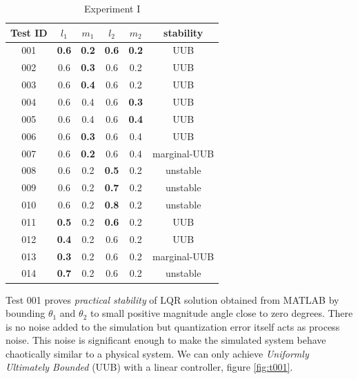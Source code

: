 \documentclass[journal]{IEEEtran}
\begin{document}
\begin{table}[!t]
\renewcommand{\arraystretch}{1.3}
\caption{Experiment I}
\label{tab:001}
\centering
\begin{tabular}{|c||c|c|c|c|c|}
\hline
Test ID & \(l_1\) & \(m_1\) & \(l_2\) & \(m_2\) & stability \\
\hline\hline
001 & \textbf{0.6} & \textbf{0.2} & \textbf{0.6} & \textbf{0.2} & UUB\\
002 & 0.6 & \textbf{0.3} & 0.6 & 0.2 & UUB\\
003 & 0.6 & \textbf{0.4} & 0.6 & 0.2 & UUB\\
004 & 0.6 & 0.4 & 0.6 & \textbf{0.3} & UUB\\
005 & 0.6 & 0.4 & 0.6 & \textbf{0.4} & UUB\\
006 & 0.6 & \textbf{0.3} & 0.6 & 0.4 & UUB\\
007 & 0.6 & \textbf{0.2} & 0.6 & 0.4 & marginal-UUB\\
008 & 0.6 & 0.2 & \textbf{0.5} & 0.2 & unstable\\
009 & 0.6 & 0.2 & \textbf{0.7} & 0.2 & unstable\\
010 & 0.6 & 0.2 & \textbf{0.8} & 0.2 & unstable\\
011 & \textbf{0.5} & 0.2 & \textbf{0.6} & 0.2 & UUB\\
012 & \textbf{0.4} & 0.2 & 0.6 & 0.2 & UUB \\
013 & \textbf{0.3} & 0.2 & 0.6 & 0.2 & marginal-UUB\\
014 & \textbf{0.7} & 0.2 & 0.6 & 0.2 & unstable\\
\hline
\end{tabular}
\end{table}

Test 001 proves \emph{practical stability} of LQR solution obtained from MATLAB
by bounding \(\theta_1\) and \(\theta_2\) to small positive magnitude angle
close to zero degrees. There is no noise added to the simulation but quantization
error itself acts as process noise. This noise is significant enough to make the
simulated system behave chaotically similar to a physical system. We can only
achieve \emph{Uniformly Ultimately Bounded} (UUB) with a linear controller,
figure \ref{fig:t001}.
\end{document}

